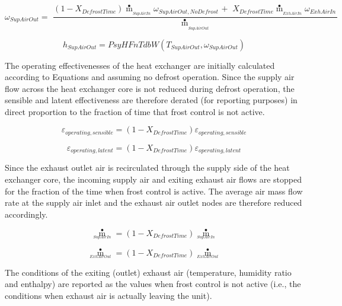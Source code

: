 \begin{equation}
{\omega_{SupAirOut}} = \,\,\frac{{(1 - {X_{DefrostTime}}){{\mathop m\limits^ \bullet  }_{_{SupAirIn}}}{\omega_{SupAirOut,NoDefrost\,}} + \,\,{X_{DefrostTime}}{{\mathop m\limits^ \bullet  }_{_{ExhAirIn}}}{\omega_{ExhAirIn\,}}}}{{{{\mathop m\limits^ \bullet  }_{_{SupAirOut}}}}}
\end{equation}

\begin{equation}
{h_{SupAirOut}} = PsyHFnTdbW({T_{SupAirOut}},{\omega_{SupAirOut}})
\end{equation}

The operating effectivenesses of the heat exchanger are initially calculated according to Equations and assuming no defrost operation. Since the supply air flow across the heat exchanger core is not reduced during defrost operation, the sensible and latent effectiveness are therefore derated (for reporting purposes) in direct proportion to the fraction of time that frost control is not active.

\begin{equation}
{\varepsilon_{operating,sensible}} = (1 - {X_{DefrostTime}}){\varepsilon_{operating,sensible}}
\end{equation}

\begin{equation}
{\varepsilon_{operating,latent}} = (1 - {X_{DefrostTime}}){\varepsilon_{operating,latent}}
\end{equation}

Since the exhaust outlet air is recirculated through the supply side of the heat exchanger core, the incoming supply air and exiting exhaust air flows are stopped for the fraction of the time when frost control is active. The average air mass flow rate at the supply air inlet and the exhaust air outlet nodes are therefore reduced accordingly.

\begin{equation}
{\mathop m\limits^ \bullet_{_{SupAirIn}}} = (1 - {X_{DefrostTime}}){\mathop m\limits^ \bullet_{_{SupAirIn}}}
\end{equation}

\begin{equation}
{\mathop m\limits^ \bullet_{_{ExhAirOut}}} = (1 - {X_{DefrostTime}}){\mathop m\limits^ \bullet_{_{ExhAirOut}}}
\end{equation}

The conditions of the exiting (outlet) exhaust air (temperature, humidity ratio and enthalpy) are reported as the values when frost control is not active (i.e., the conditions when exhaust air is actually leaving the unit).

